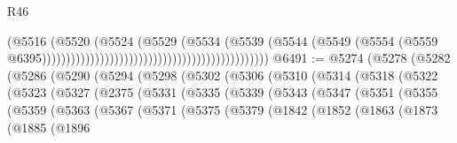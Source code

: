 \begin{lexlean}{R46}
\begin{coremodule}
                                                                              (@5516
                                                                                (@5520
                                                                                  (@5524
                                                                                    (@5529
                                                                                      (@5534
                                                                                        (@5539
                                                                                          (@5544
                                                                                            (@5549
                                                                                              (@5554
                                                                                                (@5559
                                                                                                  @6395)))))))))))))))))))))))))))))))))))))))))))))))
@6491 := @5274
    (@5278
      (@5282
        (@5286
          (@5290
            (@5294
              (@5298
                (@5302
                  (@5306
                    (@5310
                      (@5314
                        (@5318
                          (@5322
                            (@5323
                              (@5327
                                (@2375
                                  (@5331
                                    (@5335
                                      (@5339
                                        (@5343
                                          (@5347
                                            (@5351
                                              (@5355
                                                (@5359
                                                  (@5363
                                                    (@5367
                                                      (@5371
                                                        (@5375
                                                          (@5379
                                                            (@1842
                                                              (@1852
                                                                (@1863
                                                                  (@1873
                                                                    (@1885
                                                                      (@1896

\end{coremodule}
\end{lexlean}
